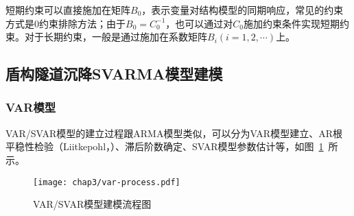 短期约束可以直接施加在矩阵$B_0$，表示变量对结构模型的同期响应，常见的约束方式是0约束排除方法；由于$B_0=C_0^{-1}$，也可以通过对$C_0$施加约束条件实现短期约束。对于长期约束，一般是通过施加在系数矩阵$B_i(i=1,2,\cdots )$上。

\subsection{盾构隧道沉降SVARMA模型建模}

\subsubsection{VAR模型}

VAR/SVAR模型的建立过程跟ARMA模型类似，可以分为VAR模型建立、AR根平稳性检验（Liitkepohl，\citeyear{liitkepohl1991introduction}）、滞后阶数确定、SVAR模型参数估计等，如图~\ref{fig:VARSVAR模型建模流程图}~所示。

\begin{figure}[htb!]
    \centering
    \texttt{[image: chap3/var-process.pdf]}
    \caption{VAR/SVAR模型建模流程图}
    \label{fig:VARSVAR模型建模流程图}
\end{figure}

